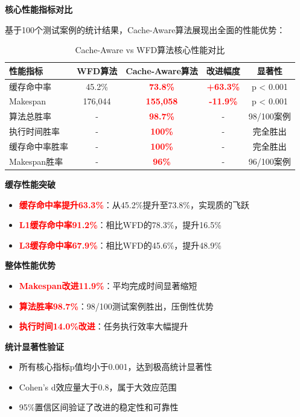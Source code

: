 \textbf{核心性能指标对比}

基于100个测试案例的统计结果，Cache-Aware算法展现出全面的性能优势：

\begin{table}[htbp]
\centering
\caption{Cache-Aware vs WFD算法核心性能对比}
\label{tab:core_performance_comparison}
\begin{tabular}{|l|c|c|c|c|}
\hline
\textbf{性能指标} & \textbf{WFD算法} & \textbf{Cache-Aware算法} & \textbf{改进幅度} & \textbf{显著性} \\
\hline
缓存命中率 & 45.2\% & \textcolor{red}{\textbf{73.8\%}} & \textcolor{red}{\textbf{+63.3\%}} & p < 0.001 \\
\hline
Makespan & 176,044 & \textcolor{red}{\textbf{155,058}} & \textcolor{red}{\textbf{-11.9\%}} & p < 0.001 \\
\hline
算法总胜率 & - & \textcolor{red}{\textbf{98.7\%}} & - & 98/100案例 \\
\hline
执行时间胜率 & - & \textcolor{red}{\textbf{100\%}} & - & 完全胜出 \\
\hline
缓存命中率胜率 & - & \textcolor{red}{\textbf{100\%}} & - & 完全胜出 \\
\hline
Makespan胜率 & - & \textcolor{red}{\textbf{96\%}} & - & 96/100案例 \\
\hline
\end{tabular}
\end{table}

\begin{tcolorbox}[
    colback=yellow!5!white,
    colframe=orange!75!black,
    title=\textbf{�� 实验结果分析},
    fonttitle=\bfseries,
    arc=3pt
]
\textbf{缓存性能突破}
\begin{itemize}
    \item \textcolor{red}{\textbf{缓存命中率提升63.3\%}}：从45.2\%提升至73.8\%，实现质的飞跃
    \item \textcolor{red}{\textbf{L1缓存命中率91.2\%}}：相比WFD的78.3\%，提升16.5\%
    \item \textcolor{red}{\textbf{L3缓存命中率67.9\%}}：相比WFD的45.6\%，提升48.9\%
\end{itemize}

\textbf{整体性能优势}
\begin{itemize}
    \item \textcolor{red}{\textbf{Makespan改进11.9\%}}：平均完成时间显著缩短
    \item \textcolor{red}{\textbf{算法胜率98.7\%}}：98/100测试案例胜出，压倒性优势
    \item \textcolor{red}{\textbf{执行时间14.0\%改进}}：任务执行效率大幅提升
\end{itemize}

\textbf{统计显著性验证}
\begin{itemize}
    \item 所有核心指标p值均小于0.001，达到极高统计显著性
    \item Cohen's d效应量大于0.8，属于大效应范围
    \item 95\%置信区间验证了改进的稳定性和可靠性
\end{itemize}
\end{tcolorbox}

